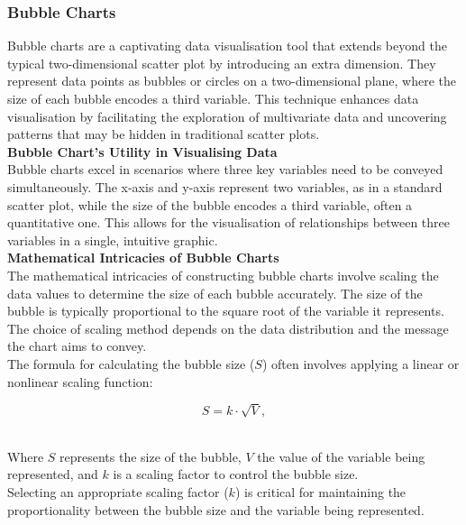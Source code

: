 \documentclass{article}\usepackage[]{graphicx}\usepackage[]{xcolor}
\begin{document}
\subsubsection{Bubble Charts}
Bubble charts are a captivating data visualisation tool that extends beyond the typical two-dimensional scatter plot by introducing an extra dimension. They represent data points as bubbles or circles on a two-dimensional plane, where the size of each bubble encodes a third variable. This technique enhances data visualisation by facilitating the exploration of multivariate data and uncovering patterns that may be hidden in traditional scatter plots.\\

\noindent
\textbf{Bubble Chart's Utility in Visualising Data}\\

\noindent
Bubble charts excel in scenarios where three key variables need to be conveyed simultaneously. The x-axis and y-axis represent two variables, as in a standard scatter plot, while the size of the bubble encodes a third variable, often a quantitative one. This allows for the visualisation of relationships between three variables in a single, intuitive graphic.\\

\noindent
\textbf{Mathematical Intricacies of Bubble Charts}\\

\noindent
The mathematical intricacies of constructing bubble charts involve scaling the data values to determine the size of each bubble accurately. The size of the bubble is typically proportional to the square root of the variable it represents. The choice of scaling method depends on the data distribution and the message the chart aims to convey.\\

\noindent
The formula for calculating the bubble size (\(S\)) often involves applying a linear or nonlinear scaling function:

\[
S = k \cdot \sqrt{V},
\]

\\\noident Where \(S\) represents the size of the bubble, \(V\) the value of the variable being represented, and \(k\) is a scaling factor to control the bubble size.\\

\noindent
Selecting an appropriate scaling factor (\(k\)) is critical for maintaining the proportionality between the bubble size and the variable being represented.\\
\end{document}
